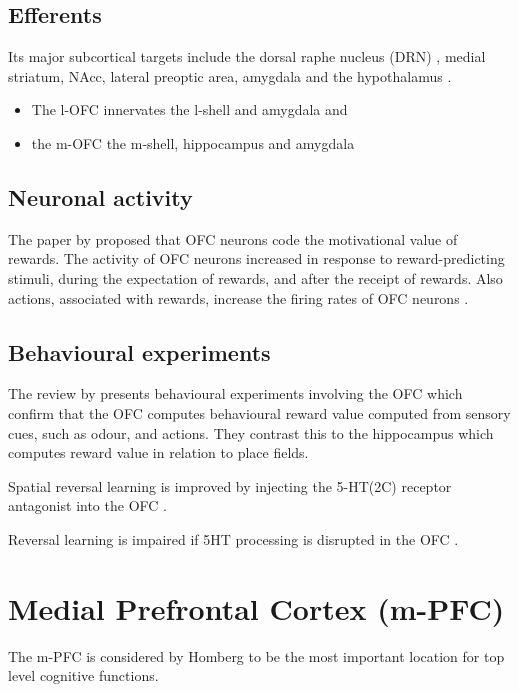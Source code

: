 \documentclass[12pt,a4paper]{article}
\begin{document}
\subsection{Efferents}
Its major subcortical targets include the dorsal raphe nucleus (DRN)
\citep{Luo2015}, medial striatum, NAcc, lateral preoptic area,
amygdala and the hypothalamus \citep{Vertes2012}.

\begin{itemize}
\item The l-OFC innervates the l-shell and amygdala and 
\item the m-OFC the m-shell, hippocampus and amygdala \citep{Brog1993,Noonan2012}
\end{itemize}
  
\subsection{Neuronal activity}
The paper by \citep{Tremblay1999} proposed that OFC neurons code the
motivational value of rewards. The activity of OFC neurons increased
in response to reward-predicting stimuli, during the expectation of
rewards, and after the receipt of rewards. Also actions, associated
with rewards, increase the firing rates of OFC neurons
\citep{Wikenheiser2016}.

\subsection{Behavioural experiments}
The review by \citep{Wikenheiser2016} presents behavioural experiments
involving the OFC which confirm that the OFC computes behavioural
reward value computed from sensory cues, such as odour, and
actions. They contrast this to the hippocampus which computes reward
value in relation to place fields.

Spatial reversal learning is improved by injecting the 5-HT(2C)
receptor antagonist into the OFC \citep{Boulougouris2010}.

Reversal learning is impaired if 5HT processing is disrupted in the
OFC \citep{Bari2013}.






\section{Medial Prefrontal Cortex (m-PFC)}
The m-PFC is considered by Homberg to be the most important location
for top level cognitive functions.
\end{document}
